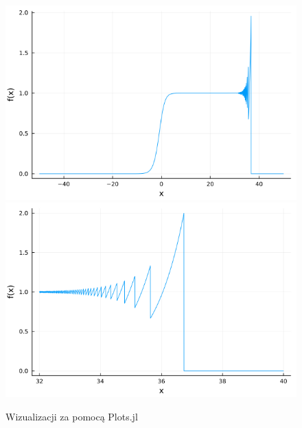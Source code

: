 \documentclass{article}
\begin{document}
\begin{figure}[h!]
    \centering
    \includegraphics[scale=0.365]{plots/f(x)-1-plots.png}
    \includegraphics[scale=0.365]{plots/f(x)-2-plots.png}
    \caption{Wizualizacji za pomocą Plots.jl}
\end{figure}
\end{document}
